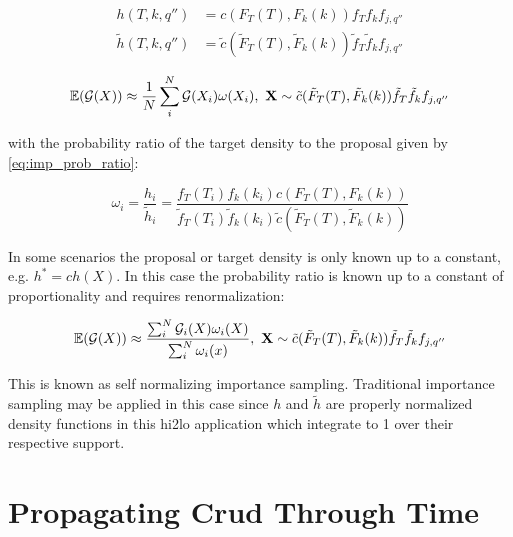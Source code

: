 \begin{align}
    h(T, k, q'') &= c(F_T(T), F_k(k)) f_T f_k f_{j,q''}  \nonumber \\
    \tilde h(T, k, q'') &= \tilde c(\tilde F_T(T), \tilde F_k(k)) \tilde f_T \tilde f_k f_{j,q''}
\label{eq:mc_imp_int_2}
\end{align}

\begin{equation}
\operatorname*{\mathbb{E}}(\mathcal G(X)) \approx \frac{1}{N} \sum_i^N \mathcal G(X_i) \omega(X_i), \ \mathbf X \sim \tilde c(\tilde F_T(T), \tilde F_k(k)) \tilde f_T \tilde f_k f_{j,q''}
\label{eq:mc_imp_int2}
\end{equation}

with the probability ratio of the target density to the proposal given by \ref{eq:imp_prob_ratio}:

\begin{equation}
\omega_i = \frac{h_i}{\tilde h_i} = \frac{f_T(T_i) f_k(k_i)c(F_T(T), F_k(k))}
  {\tilde f_T(T_i) \tilde f_k(k_i) \tilde c(\tilde F_T(T), \tilde F_k(k))}
\label{eq:imp_prob_ratio}
\end{equation}

%
%

In some scenarios the proposal or target density is only known up to a constant, e.g. $h^* = c h(X)$.  In this case the probability ratio is known up to a constant of proportionality and requires renormalization:

\begin{equation}
\operatorname*{\mathbb{E}}(\mathcal G(X)) \approx \frac{ \sum_i^N \mathcal G_i(X) \omega_i(X)}{\sum_i^N \omega_i(x)}
,
 \ \mathbf X \sim \tilde c(\tilde F_T(T), \tilde F_k(k)) \tilde f_T \tilde f_k f_{j,q''}
\end{equation}

This is known as self normalizing importance sampling.  Traditional importance sampling may be applied in this case since $h$ and $\tilde{h}$ are properly normalized density functions in this hi2lo application which integrate to 1 over their respective support.


\section{Propagating Crud Through Time}

